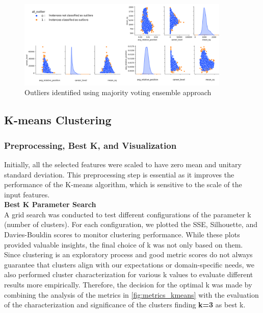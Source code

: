 \begin{figure}[H]
\centering
\includegraphics[width=0.9\textwidth]{images/CLUSTER/outlier.png}
\caption{ \small Outliers identified using majority voting ensemble approach\small }
\label{fig:outlier}
\end{figure}


\subsection{K-means Clustering}
\subsubsection{Preprocessing, Best K, and Visualization}

Initially, all the selected features were scaled to have zero mean and unitary standard deviation. This preprocessing step is essential as it improves the performance of the K-means algorithm, which is sensitive to the scale of the input features. \\

\noindent
\textbf{Best K Parameter Search}\\
A grid search was conducted to test different configurations of the parameter k (number of clusters). For each configuration, we plotted the SSE, Silhouette, and Davies-Bouldin scores to monitor clustering performance. While these plots provided valuable insights, the final choice of k was not only based on them.
Since clustering is an exploratory process and good metric scores do not always guarantee that clusters align with our expectations or domain-specific needs, we also performed cluster characterization for various k values to evaluate different results more empirically.
Therefore, the decision for the optimal k was made by combining the analysis of the metrics in \autoref{fig:metrics_kmeans} with the evaluation of the characterization and significance of the clusters finding \textbf{k=3} as best k.\\


